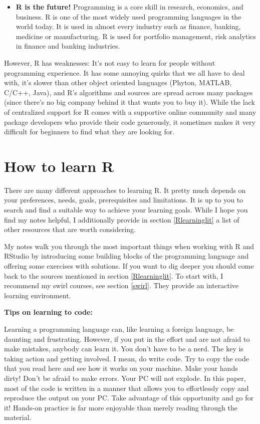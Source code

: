 \documentclass[
  12pt,
  oneside]{book}
\begin{document}
\begin{itemize}
\item
  \textbf{R is the future!} Programming is a core skill in research, economics, and business. R is one of the most widely used programming languages in the world today. It is used in almost every industry such as finance, banking, medicine or manufacturing. R is used for portfolio management, risk analytics in finance and banking industries.
\end{itemize}

However, R has weaknesses: It's not easy to learn for people without programming experience. It has some annoying quirks that we all have to deal with, it's slower than other object oriented languages (Phyton, MATLAB, C/C++, Java), and R's algorithms and sources are spread across many packages (since there's no big company behind it that wants you to buy it). While the lack of centralized support for R comes with a supportive online community and many package developers who provide their code generously, it sometimes makes it very difficult for beginners to find what they are looking for.

\hypertarget{howtolearnr}{%
\section{How to learn R}\label{howtolearnr}}

There are many different approaches to learning R. It pretty much depends on your preferences, needs, goals, prerequisites and limitations. It is up to you to search and find a suitable way to achieve your learning goals. While I hope you find my notes helpful, I additionally provide in section \ref{Rlearninglit} a list of other resources that are worth considering.

My notes walk you through the most important things when working with R and RStudio by introducing some building blocks of the programming language and offering some exercises with solutions. If you want to dig deeper you should come back to the sources mentioned in section \ref{Rlearninglit}. To start with, I recommend my swirl courses, see section \ref{swirl}. They provide an interactive learning environment.

\textbf{Tips on learning to code:}

Learning a programming language can, like learning a foreign language, be daunting and frustrating. However, if you put in the effort and are not afraid to make mistakes, anybody can learn it. You don't have to be a nerd. The key is taking action and getting involved. I mean, do write code. Try to copy the code that you read here and see how it works on your machine. Make your hands dirty! Don't be afraid to make errors. Your PC will not explode.
In this paper, most of the code is written in a manner that allows you to effortlessly copy and reproduce the output on your PC. Take advantage of this opportunity and go for it! Hands-on practice is far more enjoyable than merely reading through the material.
\end{document}

